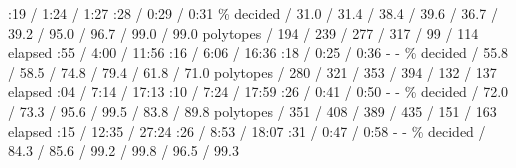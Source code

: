             :19 / 1:24 / 1:27 \eTD
            :28 / 0:29 / 0:31 \eTD
        \eTR
        \bTR
            \bTD \% decided \eTD
             / 31.0 / 31.4 \eTD
             / 38.4 / 39.6 \eTD
             / 36.7 / 39.2 \eTD
             / 95.0 / 96.7 \eTD
             / 99.0 / 99.0 \eTD
        \eTR
        \bTR[topframe=on]
             \eTH
            \bTD polytopes \eTD
             / 194 / 239 \eTD
             / 277 / 317 \eTD
             / 99 / 114 \eTD
            \bTD  \eTD
            \bTD  \eTD
        \eTR
        \bTR
            \bTD elapsed \eTD
            :55 / 4:00 / 11:56 \eTD
            :16 / 6:06 / 16:36 \eTD
            :18 / 0:25 / 0:36 \eTD
            \bTD - \eTD
            \bTD - \eTD
        \eTR
        \bTR
            \bTD \% decided \eTD
             / 55.8 / 58.5 \eTD
             / 74.8 / 79.4 \eTD
             / 61.8 / 71.0 \eTD
            \bTD  \eTD
            \bTD  \eTD
        \eTR
        \bTR[topframe=on]
             \eTH
            \bTD polytopes \eTD
             / 280 / 321 \eTD
             / 353 / 394 \eTD
             / 132 / 137 \eTD
            \bTD  \eTD
            \bTD  \eTD
        \eTR
        \bTR
            \bTD elapsed \eTD
            :04 / 7:14 / 17:13 \eTD
            :10 / 7:24 / 17:59 \eTD
            :26 / 0:41 / 0:50 \eTD
            \bTD - \eTD
            \bTD - \eTD
        \eTR
        \bTR
            \bTD \% decided \eTD
             / 72.0 / 73.3 \eTD
             / 95.6 / 99.5 \eTD
             / 83.8 / 89.8 \eTD
            \bTD  \eTD
            \bTD  \eTD
        \eTR
        \bTR[topframe=on]
             \eTH
            \bTD polytopes \eTD
             / 351 / 408 \eTD
             / 389 / 435 \eTD
             / 151 / 163 \eTD
            \bTD  \eTD
            \bTD  \eTD
        \eTR
        \bTR
            \bTD elapsed \eTD
            :15 / 12:35 / 27:24 \eTD
            :26 / 8:53 / 18:07 \eTD
            :31 / 0:47 / 0:58 \eTD
            \bTD - \eTD
            \bTD - \eTD
        \eTR
        \bTR
            \bTD \% decided \eTD
             / 84.3 / 85.6 \eTD
             / 99.2 / 99.8 \eTD
             / 96.5 / 99.3 \eTD
            \bTD  \eTD
            \bTD  \eTD
        \eTR
    \eTABLE
\stopbuffer

\startsubsection[title={Results},reference=sec:cases-integrator-results]

